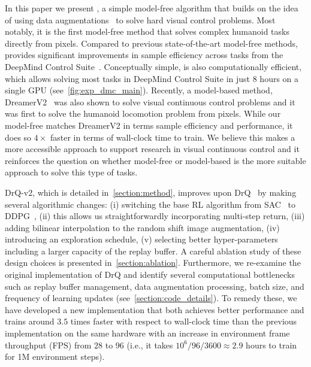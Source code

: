In this paper we present \drq{}, a simple model-free algorithm that builds on the idea of using data augmentations~\citep{yarats2021image,laskin2020reinforcement} to solve hard visual control problems. Most notably, it is the first model-free method that solves complex humanoid tasks directly from pixels. Compared to previous state-of-the-art model-free methods, \drqs{} provides significant improvements in sample efficiency across tasks from the DeepMind Control Suite~\citep{tassa2018dmcontrol}. Conceptually simple, \drqs{} is also computationally efficient, which allows solving most tasks in DeepMind Control Suite in just $8$ hours on a single GPU (see~\cref{fig:exp_dmc_main}). Recently, a model-based method, DreamerV2~\citep{hafner2020dreamerv2} was also shown to solve visual continuous control problems and it was first to solve the humanoid locomotion problem from pixels. While our model-free \drqs{} matches DreamerV2 in terms sample efficiency and performance, it does so $4\times$ faster in terms of wall-clock time to train. We believe this makes \drqs{} a more accessible approach to support research in visual continuous control and it reinforces the question on whether model-free or model-based is the more suitable approach to solve this type of tasks.

DrQ-v2, which is detailed in~\cref{section:method}, improves upon DrQ~\citep{yarats2021image} by making several algorithmic changes: (i) switching the base RL algorithm from SAC~\citep{haarnoja2018sac} to DDPG~\citep{lillicrap2015ddpg}, (ii) this allows us straightforwardly incorporating multi-step return, (iii) adding bilinear interpolation to the random shift image augmentation, (iv) introducing an exploration schedule, (v) selecting better hyper-parameters including a larger capacity of the replay buffer. A careful ablation study of these design choices is presented in~\cref{section:ablation}. 
Furthermore, we re-examine the original implementation of DrQ and identify several computational bottlenecks such as replay buffer management, data augmentation processing, batch size, and frequency of learning updates (see~\cref{section:code_details}). To remedy these, we have developed a new implementation that both achieves better performance and trains around $3.5$ times faster with respect to wall-clock time than the previous implementation on the same hardware with an increase in environment frame throughput (FPS) from $28$ to $96$ (i.e., it takes $10^6 / 96 / 3600 \approx 2.9$ hours to train for 1M environment steps). %



